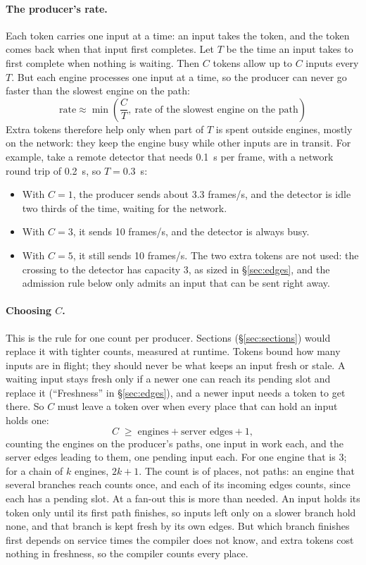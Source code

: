 \documentclass[11pt]{article}
\begin{document}
\paragraph{The producer's rate.} Each token carries one input at a time: an
input takes the token, and the token comes back when that input first
completes. Let $T$ be the time an input takes to first complete when nothing
is waiting. Then $C$ tokens allow up to $C$ inputs every $T$. But each engine
processes one input at a time, so the producer can never go faster than the
slowest engine on the path:
\[
  \text{rate} \approx \min\left(\frac{C}{T},\ \text{rate of the slowest
  engine on the path}\right)
\]
Extra tokens therefore help only when part of $T$ is spent outside engines,
mostly on the network: they keep the engine busy while other inputs are in
transit. For example, take a remote detector that needs 0.1~s per frame, with
a network round trip of 0.2~s, so $T = 0.3$~s:
\begin{itemize}[nosep]
  \item With $C = 1$, the producer sends about 3.3 frames/s, and the detector
        is idle two thirds of the time, waiting for the network.
  \item With $C = 3$, it sends 10 frames/s, and the detector is always busy.
  \item With $C = 5$, it still sends 10 frames/s. The two extra tokens are
        not used: the crossing to the detector has capacity 3, as sized in
        \S\ref{sec:edges}, and the admission rule below only admits an input
        that can be sent right away.
\end{itemize}

\paragraph{Choosing $C$.}\label{sec:choosing-c} This is the rule for one
count per producer. Sections (\S\ref{sec:sections}) would replace it with
tighter counts, measured at runtime. Tokens bound how many inputs
are in flight; they should never be what keeps an input fresh or stale. A
waiting input stays fresh only if a newer one can reach its pending slot and
replace it (``Freshness'' in \S\ref{sec:edges}), and a newer input needs a
token to get there. So $C$ must leave a token over when every place that can
hold an input holds one:
\[
  C \;\ge\; \text{engines} + \text{server edges} + 1,
\]
counting the engines on the producer's paths, one input in work each, and the
server edges leading to them, one pending input each. For one engine that is
3; for a chain of $k$ engines, $2k + 1$. The count is of places, not paths:
an engine that several branches reach counts once, and each of its incoming
edges counts, since each has a pending slot. At a fan-out this is more than
needed. An input holds its token only until its first path finishes, so
inputs left only on a slower branch hold none, and that branch is kept fresh
by its own edges. But which branch finishes first depends on service times
the compiler does not know, and extra tokens cost nothing in freshness, so
the compiler counts every place.
\end{document}
